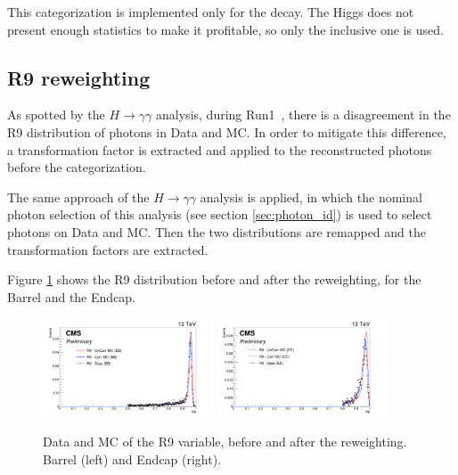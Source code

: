 This categorization is implemented only for the \Z decay. The Higgs does not present enough statistics to make it profitable, so only the inclusive one is used. 

\subsection{R9 reweighting}

As spotted by the $H \rightarrow \gamma\gamma$ analysis, during Run1~\cite{higgs_gammagamma_PAPPER}, there is a disagreement in the R9 distribution of photons in Data and MC. In order to mitigate this difference, a transformation factor is extracted and applied to the reconstructed photons before the categorization.

The same approach of the $H \rightarrow \gamma\gamma$ analysis is applied, in which the nominal photon selection of this analysis (see section \ref{sec:photon_id}) is used to select photons on Data and MC. Then the two distributions are remapped and the transformation factors are extracted. 

Figure \ref{fig:r9_reweighting} shows the R9 distribution before and after the reweighting, for the Barrel and the Endcap.


\begin{figure}[!htbp]
\begin{center}
\includegraphics[width=0.45\textwidth]{figures_and_tables/R9/R9EB.png}\hspace*{1.cm}
\includegraphics[width=0.45\textwidth]{figures_and_tables/R9/R9EE.png}
\end{center}\vspace*{-.5cm}
\caption{Data and MC of the R9 variable, before and after the reweighting. Barrel (left) and Endcap (right).}
\label{fig:r9_reweighting}
\end{figure}

